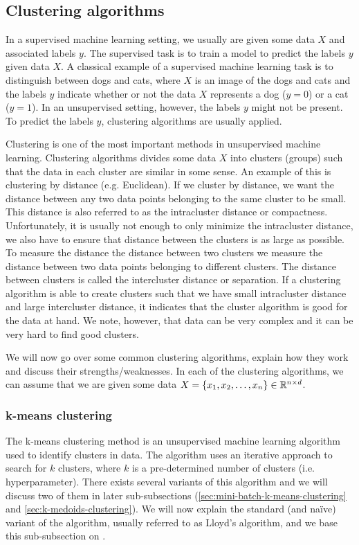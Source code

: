 \subsection{Clustering algorithms}
\label{sec:clustering-algorithms}
In a supervised machine learning setting, we usually are given some data $X$ and associated labels $y$. The supervised task is to train a model to predict the labels $y$ given data $X$. A classical example of a supervised machine learning task is to distinguish between dogs and cats, where $X$ is an image of the dogs and cats and the labels $y$ indicate whether or not the data $X$ represents a dog ($y=0$) or a cat ($y=1$). In an unsupervised setting, however, the labels $y$ might not be present. To predict the labels $y$, clustering algorithms are usually applied.

Clustering is one of the most important methods in unsupervised machine learning. Clustering algorithms divides some data $X$ into clusters (groups) such that the data in each cluster are similar in some sense. An example of this is clustering by distance (e.g. Euclidean). If we cluster by distance, we want the distance between any two data points belonging to the same cluster to be small. This distance is also referred to as the intracluster distance or compactness. Unfortunately, it is usually not enough to only minimize the intracluster distance, we also have to ensure that distance between the clusters is as large as possible. To measure the distance the distance between two clusters we measure the distance between two data points belonging to different clusters. The distance between clusters is called the intercluster distance or separation. If a clustering algorithm is able to create clusters such that we have small intracluster distance and large intercluster distance, it indicates that the cluster algorithm is good for the data at hand. We note, however, that data can be very complex and it can be very hard to find good clusters.

We will now go over some common clustering algorithms, explain how they work and discuss their strengths/weaknesses. In each of the clustering algorithms, we can assume that we are given some data $X = \left\{x_1, x_2, \ldots, x_n\right\} \in \mathbb{R}^{n \times d}$.

\subsubsection{k-means clustering}
\label{sec:k-means-clustering}
The k-means clustering method \cite[Section 9.1]{bishop2006} is an unsupervised machine learning algorithm used to identify clusters in data. The algorithm uses an iterative approach to search for $k$ clusters, where $k$ is a pre-determined number of clusters (i.e. hyperparameter). There exists several variants of this algorithm and we will discuss two of them in later sub-subsections (\cref{sec:mini-batch-k-means-clustering} and \cref{sec:k-medoids-clustering}). We will now explain the standard (and naïve) variant of the algorithm, usually referred to as Lloyd's algorithm, and we base this sub-subsection on \cite[Section 9.1]{bishop2006}.

